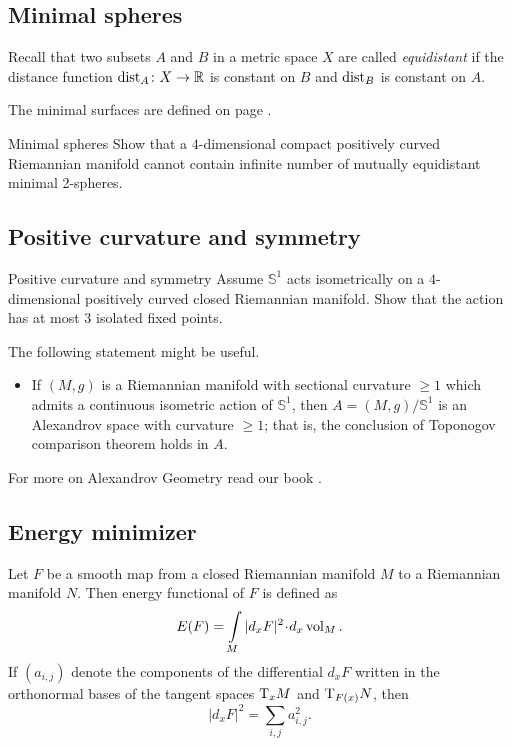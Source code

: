 \subsection*{Minimal spheres}


Recall that two subsets $A$ and $B$ in a metric space $X$ are called \emph{equidistant} if the distance function $\operatorname{\rm dist}_A\colon X\to\mathbb{R}$ is constant on $B$ and $\operatorname{\rm dist}_B$ is constant on $A$.

The minimal surfaces are defined on page \pageref{minimal surface}.

\begin{pr}{}{Minimal spheres}\label{Minimal spheres}
Show that a 
$4$-dimensional
compact 
positively curved 
Riemannian manifold 
cannot contain infinite number of  mutually
 equidistant minimal 2-spheres.
\end{pr}


\subsection*{Positive curvature and symmetry\thm}

\begin{pr}{\thm}{Positive curvature and symmetry}\label{kleiner-hopf} 
Assume $\mathbb S^1$ acts isometrically on a $4$-dimensional positively curved closed Riemannian manifold.
Show that the action 
has at most $3$ isolated fixed points.
\end{pr}

The following statement might be useful.
\begin{itemize}
\item If $(M,g)$ is a Riemannian manifold with sectional curvature $\ge 1$ which admits a continuous isometric action of $\mathbb S^1$, 
then $A=(M,g)/\mathbb S^1$ is an Alexandrov space with curvature $\ge 1$;
that is, the conclusion of Toponogov comparison theorem holds in $A$. 
\end{itemize}
For more on Alexandrov Geometry read our book \cite{akp}.

\subsection*{Energy minimizer}

Let $F$ be a smooth map from a closed Riemannian manifold $M$ to a Riemannian manifold $N$.
Then energy functional of $F$ is defined as
\[E(F)=\int\limits_M |d_xF|^2\cdot d_x\vol_M.\]
If $(a_{i,j})$ denote the components 
of the differential $d_xF$ 
written in the orthonormal bases of the tangent spaces $\mathrm{T}_xM$ and $\mathrm{T}_{F(x)}N$,
then 
\[|d_xF|^2=\sum_{i,j}a_{i,j}^2.\]

